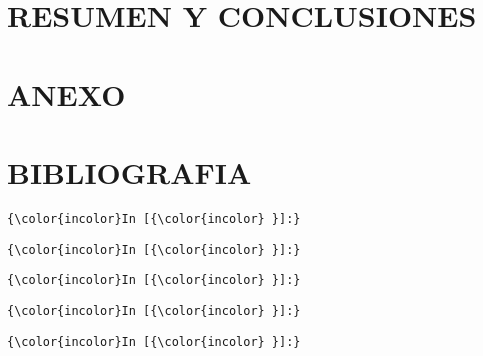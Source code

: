 \documentclass[12pt]{book}
\begin{document}
\chapter{RESUMEN Y CONCLUSIONES}\label{resumen-y-conclusiones}

\chapter{ANEXO}\label{anexo}

\chapter{BIBLIOGRAFIA}\label{bibliografia}

    \begin{Verbatim}[commandchars=\\\{\}]
{\color{incolor}In [{\color{incolor} }]:}
\end{Verbatim}

    \begin{Verbatim}[commandchars=\\\{\}]
{\color{incolor}In [{\color{incolor} }]:}
\end{Verbatim}

    \begin{Verbatim}[commandchars=\\\{\}]
{\color{incolor}In [{\color{incolor} }]:}
\end{Verbatim}

    \begin{Verbatim}[commandchars=\\\{\}]
{\color{incolor}In [{\color{incolor} }]:}
\end{Verbatim}

    \begin{Verbatim}[commandchars=\\\{\}]
{\color{incolor}In [{\color{incolor} }]:}
\end{Verbatim}








    
\end{document}
